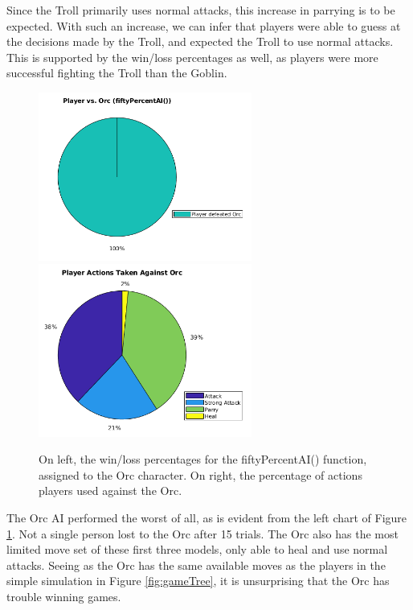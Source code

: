 Since the Troll primarily uses normal attacks, this increase in parrying is to be expected. With such an increase, we can infer that players were able to guess at the decisions made by the Troll, and expected the Troll to use normal attacks. This is supported by the win/loss percentages as well, as players were more successful fighting the Troll than the Goblin.

\begin{figure}[H]
  \centering
  \includegraphics[width=7cm]{figures/orcWins.png}
  \includegraphics[width=7cm]{figures/actionsOrc.png}
  \caption{On left, the win/loss percentages for the fiftyPercentAI() function, assigned to the Orc character. On right, the percentage of actions players used against the Orc.}
  \label{fig:pieOrc}
\end{figure}

The Orc AI performed the worst of all, as is evident from the left chart of Figure \ref{fig:pieOrc}. Not a single person lost to the Orc after 15 trials. The Orc also has the most limited move set of these first three models, only able to heal and use normal attacks. Seeing as the Orc has the same available moves as the players in the simple simulation in Figure \ref{fig:gameTree}, it is unsurprising that the Orc has trouble winning games.\\

